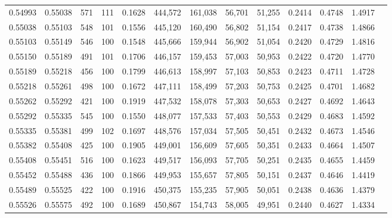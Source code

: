 \begin{tabular}{rrrrrrrrrrrrr}
0.54993 & 0.55038 &   571 & 111 &                                     0.1628 & 444,572 & 161,038 &  56,701 &  51,255 & 0.2414 & 0.4748 & 1.4917 \\
0.55038 & 0.55103 &   548 & 101 &                                     0.1556 & 445,120 & 160,490 &  56,802 &  51,154 & 0.2417 & 0.4738 & 1.4866 \\
0.55103 & 0.55149 &   546 & 100 &                                     0.1548 & 445,666 & 159,944 &  56,902 &  51,054 & 0.2420 & 0.4729 & 1.4816 \\
0.55150 & 0.55189 &   491 & 101 &                                     0.1706 & 446,157 & 159,453 &  57,003 &  50,953 & 0.2422 & 0.4720 & 1.4770 \\
0.55189 & 0.55218 &   456 & 100 &                                     0.1799 & 446,613 & 158,997 &  57,103 &  50,853 & 0.2423 & 0.4711 & 1.4728 \\
0.55218 & 0.55261 &   498 & 100 &                                     0.1672 & 447,111 & 158,499 &  57,203 &  50,753 & 0.2425 & 0.4701 & 1.4682 \\
0.55262 & 0.55292 &   421 & 100 &                                     0.1919 & 447,532 & 158,078 &  57,303 &  50,653 & 0.2427 & 0.4692 & 1.4643 \\
0.55292 & 0.55335 &   545 & 100 &                                     0.1550 & 448,077 & 157,533 &  57,403 &  50,553 & 0.2429 & 0.4683 & 1.4592 \\
0.55335 & 0.55381 &   499 & 102 &                                     0.1697 & 448,576 & 157,034 &  57,505 &  50,451 & 0.2432 & 0.4673 & 1.4546 \\
0.55382 & 0.55408 &   425 & 100 &                                     0.1905 & 449,001 & 156,609 &  57,605 &  50,351 & 0.2433 & 0.4664 & 1.4507 \\
0.55408 & 0.55451 &   516 & 100 &                                     0.1623 & 449,517 & 156,093 &  57,705 &  50,251 & 0.2435 & 0.4655 & 1.4459 \\
0.55452 & 0.55488 &   436 & 100 &                                     0.1866 & 449,953 & 155,657 &  57,805 &  50,151 & 0.2437 & 0.4646 & 1.4419 \\
0.55489 & 0.55525 &   422 & 100 &                                     0.1916 & 450,375 & 155,235 &  57,905 &  50,051 & 0.2438 & 0.4636 & 1.4379 \\
0.55526 & 0.55575 &   492 & 100 &                                     0.1689 & 450,867 & 154,743 &  58,005 &  49,951 & 0.2440 & 0.4627 & 1.4334 \\

\end{tabular}
